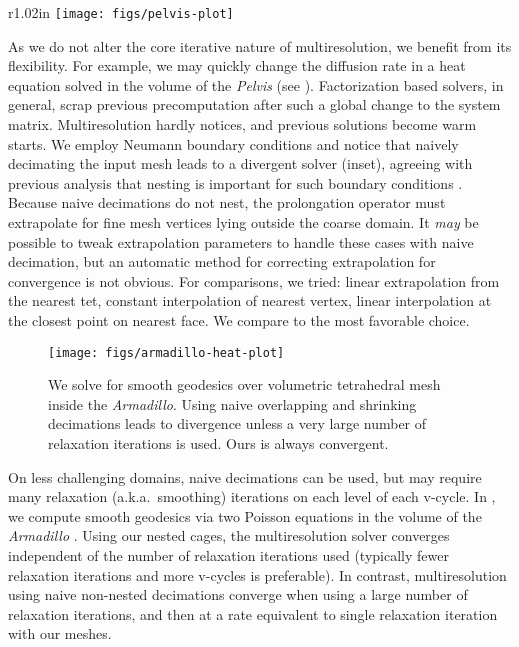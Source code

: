 \begin{wrapfigure}{r}{1.02in}
%
\centering
%
\texttt{[image: figs/pelvis-plot]}
%
\end{wrapfigure}
%
As we do not alter the core iterative nature of multiresolution, we benefit
from its flexibility. For example, we may quickly change the diffusion rate in
a heat equation solved in the volume of the \emph{Pelvis} (see
). 
%
Factorization based solvers, in general, scrap previous precomputation after
such a global change to the system matrix. 
%
Multiresolution hardly notices, and previous solutions become warm starts.
%
We employ Neumann boundary conditions and notice that naively decimating the
input mesh leads to a divergent solver (inset), agreeing with previous analysis
that nesting is important for such boundary conditions \cite{chan1999boundary}.
%
Because naive decimations do not nest, the prolongation operator must
extrapolate for fine mesh vertices lying outside the coarse domain.
%
It \emph{may} be
possible to tweak extrapolation parameters to handle these cases with naive
decimation, but an automatic method for correcting extrapolation for
convergence is not obvious.
%
For comparisons, we tried: linear extrapolation from the nearest tet, constant
interpolation of nearest vertex, linear interpolation at the closest point on
nearest face. We compare to the most favorable choice.


\begin{figure}
  \texttt{[image: figs/armadillo-heat-plot]}
  \caption{We solve for smooth geodesics over  volumetric tetrahedral mesh
  inside the \emph{Armadillo}. Using naive overlapping and
  shrinking decimations leads to divergence unless a very large number of
  relaxation iterations is used.  Ours is always convergent.}
  \label{fig:armadillo-heat-plot}
\end{figure}

On less challenging domains, naive decimations can be used, but may require
many relaxation (a.k.a.\ smoothing) iterations on each level of each v-cycle.
%
In , we compute smooth geodesics via two Poisson
equations in the volume of the \emph{Armadillo} \cite{Crane:2013:RFV}.
%
Using our nested cages, the multiresolution solver converges independent of the
number of relaxation iterations used (typically fewer relaxation iterations and
more v-cycles is preferable).
%
In contrast, multiresolution using naive non-nested decimations converge when
using a large number of relaxation iterations, and then at a rate equivalent to
single relaxation iteration with our meshes.


